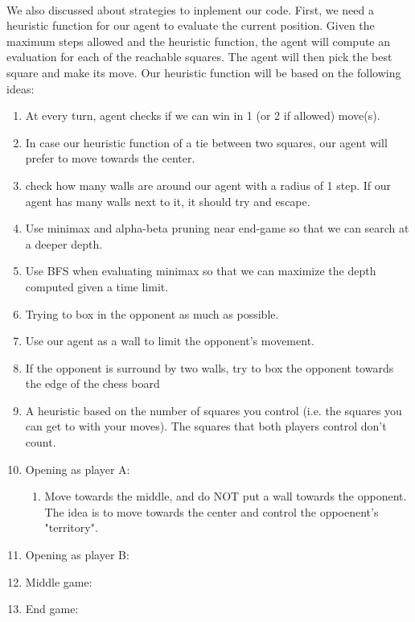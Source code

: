 \documentclass[12pt,a4paper]{article}
\begin{document}
\paragraph{} We also discussed about strategies to inplement our code. First, we need a 
heuristic function for our agent to evaluate the current position. Given the maximum steps 
allowed and the heuristic function, the agent will compute an evaluation for each of the 
reachable squares. The agent will then pick the best square and make its move. Our heuristic 
function will be based on the following ideas:
\begin{enumerate}
    \item At every turn, agent checks if we can win in 1 (or 2 if allowed) move(s). 
    \item In case our heuristic function of a tie between two squares, our agent will prefer to move towards the center.
    \item check how many walls are around our agent with a radius of 1 step. 
    If our agent has many walls next to it, it should try and escape.
    \item Use minimax and alpha-beta pruning near end-game so that we can search at a deeper depth. 
    \item Use BFS when evaluating minimax so that we can maximize the depth computed given a time limit. 
    \item Trying to box in the opponent as much as possible.
    \item Use our agent as a wall to limit the opponent's movement.
    \item If the opponent is surround by two walls, try to box the opponent towards the edge of the chess board
    \item A heuristic based on the number of squares you control (i.e. the squares you can 
    get to with your moves). The squares that both players control don't count. 
    \item Opening as player A:
    \begin{enumerate}
        \item Move towards the middle, and do NOT put a wall towards the opponent. 
        The idea is to move towards the center and control the oppoenent's "territory". 
    \end{enumerate}
    \item Opening as player B: 
    \item Middle game: 
    \item End game: 
    \begin{enumerate}

\end{enumerate}
\end{enumerate}
\end{document}
